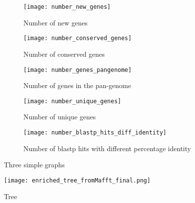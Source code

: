 \graphicspath{{images/pangenomeAnalysis/}{images/phylogeneticStructureHostData}}


\begin{figure}[h!] 
     \centering
     \begin{subfigure}[b]{0.45\textwidth}
        \centering
        \texttt{[image: number\_new\_genes]}
        \caption{Number of new genes}
        \label{fig:new genes}
     \end{subfigure}
     \hfill
     \begin{subfigure}[b]{0.45\textwidth}
        \centering
        \texttt{[image: number\_conserved\_genes]}
        \caption{Number of conserved genes}
        \label{fig:conserved genes}
     \end{subfigure}
     \hfill
     \begin{subfigure}[b]{0.45\textwidth}
        \centering
        \texttt{[image: number\_genes\_pangenome]}
        \caption{Number of genes in the pan-genome}
        \label{fig:pagenome genes}
     \end{subfigure}
     \hfill
     \begin{subfigure}[b]{0.45\textwidth}
        \centering
        \texttt{[image: number\_unique\_genes]}
        \caption{Number of unique genes}
        \label{fig:unique genes}
     \end{subfigure}
     \hfill
     \begin{subfigure}[b]{0.45\textwidth}
        \centering
        \texttt{[image: number\_blastp\_hits\_diff\_identity]}
        \caption{Number of blastp hits with different percentage identity}
        \label{fig:blastp identity}
     \end{subfigure}
        \caption{Three simple graphs}
        \label{fig:genes vs genomes}
\end{figure}




\begin{figure}
   \centering
   \texttt{[image: enriched\_tree\_fromMafft\_final.png]}
   \caption{Tree}
   \label{core alignement mafft tree}
\end{figure}


